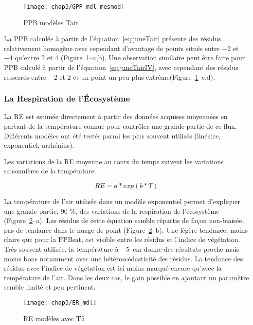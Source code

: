 \begin{figure}
\centering
\texttt{[image: chap3/GPP\_mdl\_mesmod]}
\caption{PPB modèles Tair}
\label{fig:PPB_Tair_mdl}
\end{figure}

La PPB calculée à partir de l'équation~\ref{eq:juneTair} présente des résidus relativement homogène avec cependant d'avantage de points situés entre \num{-2} et \num{-4} qu'entre \num{2} et \num{4} (Figure~\ref{fig:PPB_Tair_mdl}--a,b).
Une observation similaire peut être faire pour PPB calculé à partir de l'équation~\ref{eq:juneTairIV}, avec cependant des résidus resserrés entre \num{-2} et \num{2} et un point un peu plus extrême(Figure~\ref{fig:PPB_Tair_mdl}--c,d).

\subsubsection{La Respiration de l'Écosystème}


La RE est estimée directement à partir des données acquises moyennées en partant de la température connue pour contrôler une grande partie de ce flux.
Différents modèles ont été testés parmi les plus souvent utilisés (linéaire, exponentiel, arrhénius).


Les variations de la RE moyenne au cours du temps suivent les variations saisonnières de la température.

\begin{equation} \label{eq:RE_T}
RE = a*exp(b*T)
\end{equation}

La température de l'air utilisée dans un modèle exponentiel permet d'expliquer une grande partie, 90 \%, des variations de la respiration de l'écosystème (Figure~\ref{fig:ER_mdl}--a).
Les résidus de cette équation semble répartis de façon non-biaisée, pas de tendance dans le nuage de point (Figure~\ref{fig:ER_mdl}--b).
Une légère tendance, moins claire que pour la PPBsat, est visible entre les résidus et l'indice de végétation.
Très souvent utilisée, la température à \SI{-5}{\centi\metre} donne des résultats proche mais moins bons notamment avec une hétéroscédasticité des résidus.
La tendance des résidus avec l'indice de végétation est ici moins marqué encore qu'avec la température de l'air.
Dans les deux cas, le gain possible en ajoutant un paramètre semble limité et peu pertinent.

\begin{figure}
\centering
\texttt{[image: chap3/ER\_mdl]}
\caption{RE modèles avec T5}
\label{fig:ER_mdl}
\end{figure}

